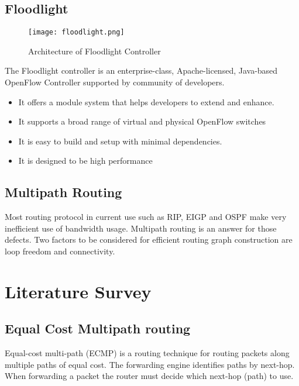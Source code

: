 \documentclass[12pt,a4paper]{article}
\begin{document}
\subsection{Floodlight}
\begin{figure}[H]
\begin{center}

\texttt{[image: floodlight.png]}
\end{center}
\caption{Architecture of Floodlight Controller}
\end{figure}

The Floodlight controller \cite{floodlight} is an enterprise-class, Apache-licensed, Java-based OpenFlow
Controller supported by community of developers.

\begin{itemize}

\item It offers a module system that helps developers to extend and enhance.
\item It supports a broad range of virtual and physical OpenFlow switches
\item It is easy to build and setup with minimal dependencies.
\item It is designed to be high performance
\end{itemize}


\subsection{Multipath Routing}
Most routing protocol in current use such as RIP, EIGP and OSPF make very
inefficient use of bandwidth usage. Multipath routing \cite{multipath} is an answer for those defects. Two
factors to be considered for efficient routing graph construction are loop freedom and
connectivity\cite{dummy}.
 



\newpage
\section{Literature Survey}

\subsection{Equal Cost Multipath routing}

Equal-cost multi-path (ECMP)\cite{ecmp} is a routing technique for routing
   packets along multiple paths of equal cost.  The forwarding engine
   identifies paths by next-hop.  When forwarding a packet the router
   must decide which next-hop (path) to use. 
\end{document}

